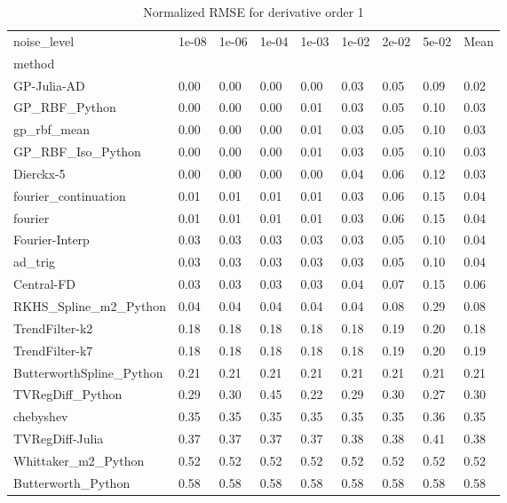 \begin{table}
\caption{Normalized RMSE for derivative order 1}
\label{tab:nrmse_order_1}
\begin{tabular}{lllllllll}
\toprule
noise_level & 1e-08 & 1e-06 & 1e-04 & 1e-03 & 1e-02 & 2e-02 & 5e-02 & Mean \\
method &  &  &  &  &  &  &  &  \\
\midrule
GP-Julia-AD & 0.00 & 0.00 & 0.00 & 0.00 & 0.03 & 0.05 & 0.09 & 0.02 \\
GP_RBF_Python & 0.00 & 0.00 & 0.00 & 0.01 & 0.03 & 0.05 & 0.10 & 0.03 \\
gp_rbf_mean & 0.00 & 0.00 & 0.00 & 0.01 & 0.03 & 0.05 & 0.10 & 0.03 \\
GP_RBF_Iso_Python & 0.00 & 0.00 & 0.00 & 0.01 & 0.03 & 0.05 & 0.10 & 0.03 \\
Dierckx-5 & 0.00 & 0.00 & 0.00 & 0.00 & 0.04 & 0.06 & 0.12 & 0.03 \\
fourier_continuation & 0.01 & 0.01 & 0.01 & 0.01 & 0.03 & 0.06 & 0.15 & 0.04 \\
fourier & 0.01 & 0.01 & 0.01 & 0.01 & 0.03 & 0.06 & 0.15 & 0.04 \\
Fourier-Interp & 0.03 & 0.03 & 0.03 & 0.03 & 0.03 & 0.05 & 0.10 & 0.04 \\
ad_trig & 0.03 & 0.03 & 0.03 & 0.03 & 0.03 & 0.05 & 0.10 & 0.04 \\
Central-FD & 0.03 & 0.03 & 0.03 & 0.03 & 0.04 & 0.07 & 0.15 & 0.06 \\
RKHS_Spline_m2_Python & 0.04 & 0.04 & 0.04 & 0.04 & 0.04 & 0.08 & 0.29 & 0.08 \\
TrendFilter-k2 & 0.18 & 0.18 & 0.18 & 0.18 & 0.18 & 0.19 & 0.20 & 0.18 \\
TrendFilter-k7 & 0.18 & 0.18 & 0.18 & 0.18 & 0.18 & 0.19 & 0.20 & 0.19 \\
ButterworthSpline_Python & 0.21 & 0.21 & 0.21 & 0.21 & 0.21 & 0.21 & 0.21 & 0.21 \\
TVRegDiff_Python & 0.29 & 0.30 & 0.45 & 0.22 & 0.29 & 0.30 & 0.27 & 0.30 \\
chebyshev & 0.35 & 0.35 & 0.35 & 0.35 & 0.35 & 0.35 & 0.36 & 0.35 \\
TVRegDiff-Julia & 0.37 & 0.37 & 0.37 & 0.37 & 0.38 & 0.38 & 0.41 & 0.38 \\
Whittaker_m2_Python & 0.52 & 0.52 & 0.52 & 0.52 & 0.52 & 0.52 & 0.52 & 0.52 \\
Butterworth_Python & 0.58 & 0.58 & 0.58 & 0.58 & 0.58 & 0.58 & 0.58 & 0.58 \\

\end{tabular}
\end{table}
